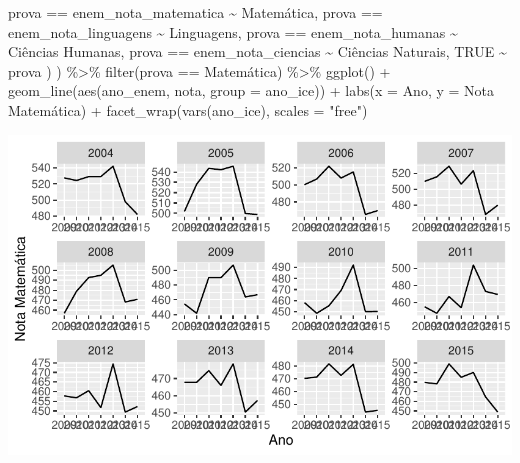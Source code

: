 \documentclass[
  letterpaper,
  DIV=11,
  numbers=noendperiod]{scrartcl}
\newenvironment{Shaded}{\begin{snugshade}}{\end{snugshade}}
\newcommand{\AttributeTok}[1]{\textcolor[rgb]{0.40,0.45,0.13}{#1}}
\newcommand{\ConstantTok}[1]{\textcolor[rgb]{0.56,0.35,0.01}{#1}}
\newcommand{\FunctionTok}[1]{\textcolor[rgb]{0.28,0.35,0.67}{#1}}
\newcommand{\NormalTok}[1]{\textcolor[rgb]{0.00,0.23,0.31}{#1}}
\newcommand{\SpecialCharTok}[1]{\textcolor[rgb]{0.37,0.37,0.37}{#1}}
\newcommand{\StringTok}[1]{\textcolor[rgb]{0.13,0.47,0.30}{#1}}
\begin{document}
\begin{Shaded}
\begin{Highlighting}[]
\NormalTok{      prova }\SpecialCharTok{==} \StringTok{\textquotesingle{}enem\_nota\_matematica\textquotesingle{}} \SpecialCharTok{\textasciitilde{}} \StringTok{\textquotesingle{}Matemática\textquotesingle{}}\NormalTok{,}
\NormalTok{      prova }\SpecialCharTok{==} \StringTok{\textquotesingle{}enem\_nota\_linguagens\textquotesingle{}} \SpecialCharTok{\textasciitilde{}} \StringTok{\textquotesingle{}Linguagens\textquotesingle{}}\NormalTok{,}
\NormalTok{      prova }\SpecialCharTok{==} \StringTok{\textquotesingle{}enem\_nota\_humanas\textquotesingle{}} \SpecialCharTok{\textasciitilde{}} \StringTok{\textquotesingle{}Ciências Humanas\textquotesingle{}}\NormalTok{,}
\NormalTok{      prova }\SpecialCharTok{==} \StringTok{\textquotesingle{}enem\_nota\_ciencias\textquotesingle{}} \SpecialCharTok{\textasciitilde{}} \StringTok{\textquotesingle{}Ciências Naturais\textquotesingle{}}\NormalTok{,}
      \ConstantTok{TRUE} \SpecialCharTok{\textasciitilde{}}\NormalTok{ prova}
\NormalTok{    )}
\NormalTok{  ) }\SpecialCharTok{\%\textgreater{}\%}
  \FunctionTok{filter}\NormalTok{(prova }\SpecialCharTok{==} \StringTok{\textquotesingle{}Matemática\textquotesingle{}}\NormalTok{) }\SpecialCharTok{\%\textgreater{}\%} 
  \FunctionTok{ggplot}\NormalTok{() }\SpecialCharTok{+}
  \FunctionTok{geom\_line}\NormalTok{(}\FunctionTok{aes}\NormalTok{(ano\_enem, nota, }\AttributeTok{group =}\NormalTok{ ano\_ice)) }\SpecialCharTok{+}
  \FunctionTok{labs}\NormalTok{(}\AttributeTok{x =} \StringTok{\textquotesingle{}Ano\textquotesingle{}}\NormalTok{, }\AttributeTok{y =} \StringTok{\textquotesingle{}Nota Matemática\textquotesingle{}}\NormalTok{) }\SpecialCharTok{+}
  \FunctionTok{facet\_wrap}\NormalTok{(}\FunctionTok{vars}\NormalTok{(ano\_ice), }\AttributeTok{scales =} \StringTok{"free"}\NormalTok{)}
\end{Highlighting}
\end{Shaded}

\includegraphics{script_files/figure-latex/unnamed-chunk-11-3.pdf}
\end{document}
